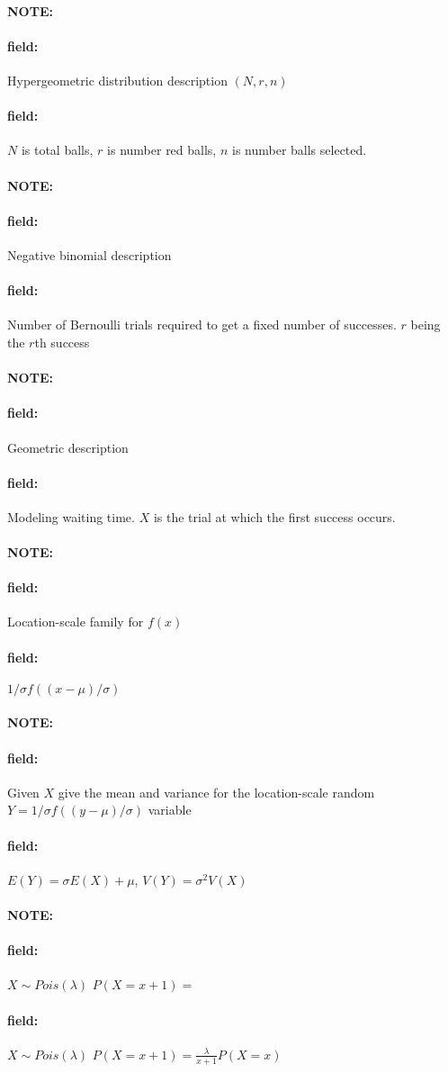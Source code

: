 \documentclass[12pt]{article}
\newenvironment{note}{\paragraph{NOTE:}}{}
\newenvironment{field}{\paragraph{field:}}{}
\begin{document}
\begin{note}
  \begin{field}
    Hypergeometric distribution description $(N,r,n)$
  \end{field}
  \begin{field}
    $N$ is total balls, $r$ is number red balls, $n$ is number balls selected.
  \end{field}
\end{note}

\begin{note}
  \begin{field}
    Negative binomial description
  \end{field}
  \begin{field}
    Number of Bernoulli trials required to get a fixed number of successes. $r$ being the $r$th success
  \end{field}
\end{note}

\begin{note}
  \begin{field}
    Geometric description
  \end{field}
  \begin{field}
    Modeling waiting time. $X$ is the trial at which the first success occurs.
  \end{field}
\end{note}

\begin{note}
  \begin{field}
    Location-scale family for $f(x)$
  \end{field}
  \begin{field}
    $1/\sigma f((x - \mu)/\sigma)$
  \end{field}
\end{note}

\begin{note}
  \begin{field}
    Given $X$ give the mean and variance for the location-scale random $Y= 1/\sigma f((y - \mu)/\sigma)$ variable
  \end{field}
  \begin{field}
    $E(Y) = \sigma E(X) + \mu$, $V(Y) = \sigma^2 V(X)$
  \end{field}
\end{note}


\begin{note}
  \begin{field}
    $X \sim Pois(\lambda)$ $P(X = x+1) = $
  \end{field}
  \begin{field}
    $X \sim Pois(\lambda)$ $P(X = x+1) = \frac{\lambda}{x + 1}P(X = x)$
  \end{field}
\end{note}
\end{document}
